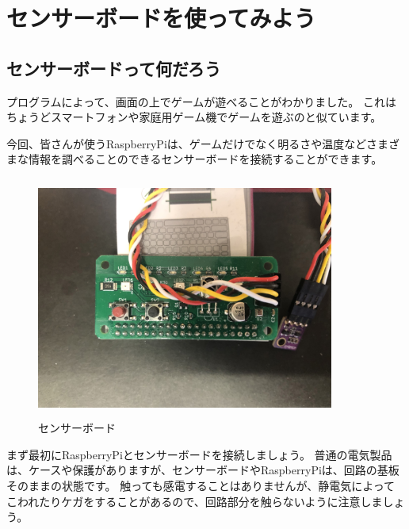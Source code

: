 
\clearpage
\section{センサーボードを使ってみよう}
\subsection{センサーボードって何だろう}

プログラムによって、画面の上でゲームが遊べることがわかりました。
これはちょうどスマートフォンや家庭用ゲーム機でゲームを遊ぶのと似ています。

今回、皆さんが使うRaspberryPiは、ゲームだけでなく明るさや温度などさまざまな情報を調べることのできるセンサーボードを接続することができます。

\begin{figure}[H]
    \begin{center}
        \includegraphics[keepaspectratio,width=9.79cm,height=7.955cm]{text02-img/sensor1.jpg}
        \caption{センサーボード}
    \end{center}
    \label{fig:folder_icon}
\end{figure}

まず最初にRaspberryPiとセンサーボードを接続しましょう。
普通の電気製品は、ケースや保護がありますが、センサーボードやRaspberryPiは、回路の基板そのままの状態です。
触っても感電することはありませんが、静電気によってこわれたりケガをすることがあるので、回路部分を触らないように注意しましょう。


